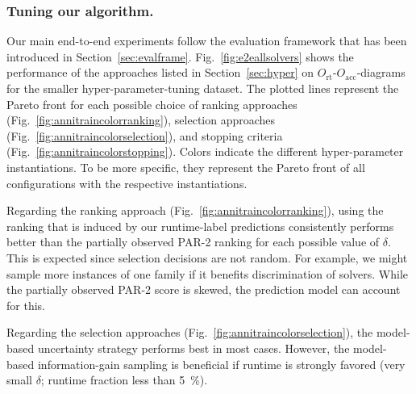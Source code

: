 \documentclass[runningheads]{llncs}
\begin{document}
\subsubsection{Tuning our algorithm.}
Our main end-to-end experiments follow the evaluation framework that has been introduced in Section~\ref{sec:evalframe}.
Fig.~\ref{fig:e2eallsolvers} shows the performance of the approaches listed in Section~\ref{sec:hyper} on $O_{\operatorname{rt}}$-$O_{\operatorname{acc}}$-diagrams for the smaller hyper-parameter-tuning dataset.
The plotted lines represent the Pareto front for each possible choice of ranking approaches (Fig.~\ref{fig:annitraincolorranking}), selection approaches (Fig.~\ref{fig:annitraincolorselection}), and stopping criteria (Fig.~\ref{fig:annitraincolorstopping}).
Colors indicate the different hyper-parameter instantiations.
To be more specific, they represent the Pareto front of all configurations with the respective instantiations.

Regarding the ranking approach (Fig.~\ref{fig:annitraincolorranking}), using the ranking that is induced by our runtime-label predictions consistently performs better than the partially observed PAR-2 ranking for each possible value of $\delta$.
This is expected since selection decisions are not random.
For example, we might sample more instances of one family if it benefits discrimination of solvers.
While the partially observed PAR-2 score is skewed, the prediction model can account for this.

Regarding the selection approaches (Fig.~\ref{fig:annitraincolorselection}), the model-based uncertainty strategy performs best in most cases.
However, the model-based information-gain sampling is beneficial if runtime is strongly favored (very small $\delta$; runtime fraction less than \SI{5}{\%}).
\end{document}
